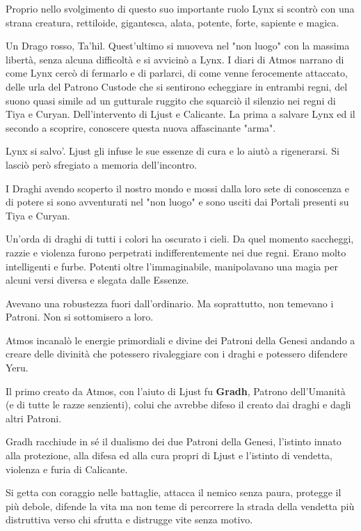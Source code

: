\documentclass[a4paper,11pt,twoside,openany]{book}
\begin{document}
Proprio nello svolgimento di questo suo importante ruolo Lynx si scontrò con una strana creatura, rettiloide, gigantesca, alata, potente, forte, sapiente e magica.

Un Drago rosso, Ta'hil. Quest'ultimo si muoveva nel "non luogo" con la massima libertà, senza alcuna difficoltà e si avvicinò a Lynx. I diari di Atmos narrano di come Lynx cercò di fermarlo e di parlarci, di come venne ferocemente attaccato, delle urla del Patrono Custode che si sentirono echeggiare in entrambi regni, del suono quasi simile ad un gutturale ruggito che squarciò il silenzio nei regni di Tiya e Curyan. Dell'intervento di Ljust e Calicante. La prima a salvare Lynx ed il secondo a scoprire, conoscere questa nuova affascinante "arma".

Lynx si salvo'. Ljust gli infuse le sue essenze di cura e lo aiutò a rigenerarsi. Si lasciò però sfregiato a memoria dell'incontro.

I Draghi avendo scoperto il nostro mondo e mossi dalla loro sete di conoscenza e di potere si sono avventurati nel "non luogo" e sono usciti dai Portali presenti su Tiya e Curyan.

Un'orda di draghi di tutti i colori ha oscurato i cieli. Da quel momento saccheggi, razzie e violenza furono perpetrati indifferentemente nei due regni. Erano molto intelligenti e furbe. Potenti oltre l'immaginabile, manipolavano una magia per alcuni versi diversa e slegata dalle Essenze.

Avevano una robustezza fuori dall'ordinario. Ma soprattutto, non temevano i Patroni. Non si sottomisero a loro.

Atmos incanalò le energie primordiali e divine dei Patroni della Genesi andando a creare delle divinità che potessero rivaleggiare con i draghi e potessero difendere Yeru.

Il primo creato da Atmos, con l'aiuto di Ljust fu \textbf{Gradh}, Patrono dell'Umanità (e di tutte le razze senzienti), colui che avrebbe difeso il creato dai draghi e dagli altri Patroni.

Gradh racchiude in sé il dualismo dei due Patroni della Genesi, l'istinto innato alla protezione, alla difesa ed alla cura propri di Ljust e l'istinto di vendetta, violenza e furia di Calicante.

Si getta con coraggio nelle battaglie, attacca il nemico senza paura, protegge il più debole, difende la vita ma non teme di percorrere la strada della vendetta più distruttiva verso chi sfrutta e distrugge vite senza motivo.
\end{document}
